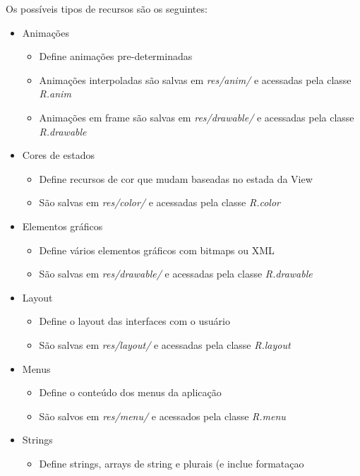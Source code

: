 Os possíveis tipos de recursos são os seguintes:
\begin{itemize}
    \item Animações
        \begin{itemize}
            \item Define animações pre-determinadas
            \item Animações interpoladas são salvas em {\it res/anim/} e acessadas 
            pela classe {\it R.anim}
            \item Animações em frame são salvas em {\it res/drawable/} e acessadas 
            pela classe {\it R.drawable}
        \end{itemize}
    \item Cores de estados
        \begin{itemize}
            \item Define recursos de cor que mudam baseadas no estada da View
            \item São salvas em {\it res/color/} e acessadas pela classe {\it R.color}
        \end{itemize}
    \item Elementos gráficos
        \begin{itemize}
            \item Define vários elementos gráficos com bitmaps ou XML
            \item São salvas em {\it res/drawable/} e acessadas pela classe {\it R.drawable}
        \end{itemize}
    \item Layout
        \begin{itemize}
            \item Define o layout das interfaces com o usuário
            \item São salvas em {\it res/layout/} e acessadas pela classe {\it R.layout}
        \end{itemize}
    \item Menus
        \begin{itemize}
            \item Define o conteúdo dos menus da aplicação
            \item São salvos em {\it res/menu/} e acessados pela classe {\it R.menu}
        \end{itemize}
    \item Strings
        \begin{itemize}
            \item Define strings, arrays de string e plurais (e inclue formataçao 

\end{itemize}
\end{itemize}
